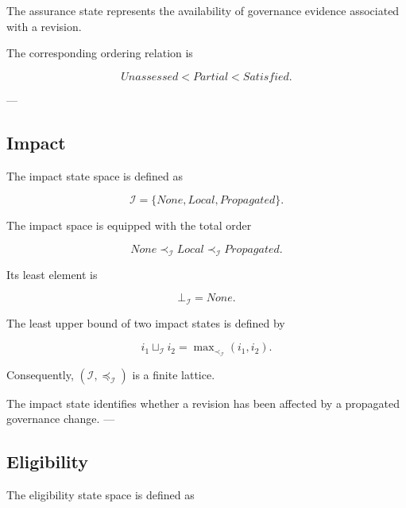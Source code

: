 \documentclass[10pt]{article}
\begin{document}
	The assurance state represents the availability of governance evidence associated with a revision.
	
	The corresponding ordering relation is
	
	\begin{equation}
		Unassessed
		<
		Partial
		<
		Satisfied.
		\label{eq:assurance_order}
	\end{equation}
	
	---
	
	\subsection{Impact}
	
	The impact state space is defined as
	
	\begin{equation}
		\mathcal{I}=
		\{
		None,
		Local,
		Propagated
		\}.
		\label{eq:impact_space}
	\end{equation}
	
	The impact space is equipped with the total order
	
	\begin{equation}
		None
		\prec_{\mathcal I}
		Local
		\prec_{\mathcal I}
		Propagated.
		\label{eq:impact_order}
	\end{equation}
	
	Its least element is
	
	\begin{equation}
		\bot_{\mathcal{I}}
		=
		None.
		\label{eq:impact_bottom}
	\end{equation}
	
	The least upper bound of two impact states is defined by
	
	\begin{equation}
		i_1
		\sqcup_{\mathcal{I}}
		i_2
		=
		\max\nolimits_{\prec_{\mathcal{I}}}
		\left(i_1,i_2\right).
		\label{eq:impact_join}
	\end{equation}
	
	Consequently,
	$\left(\mathcal{I},\preceq_{\mathcal{I}}\right)$ is a finite lattice.
	
	The impact state identifies whether a revision has been affected by a propagated governance change.
	---
	
	\subsection{Eligibility}
	
	The eligibility state space is defined as
	
\end{document}
